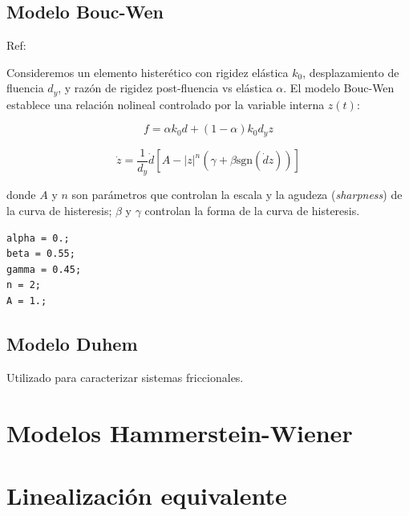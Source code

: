 \subsection{Modelo Bouc-Wen}

Ref: \textcite{song2006generalizedbouc}

Consideremos un elemento histerético con rigidez elástica $k_0$, desplazamiento de fluencia $d_y$, y razón de rigidez post-fluencia vs elástica $\alpha$. El modelo Bouc-Wen establece una relación nolineal controlado por la variable interna $z(t)$:

\begin{equation}
    f = \alpha k_0 d + (1-\alpha) k_0 d_y z
\end{equation}


\begin{equation}
    \dot{z} = \frac{1}{d_y} \dot{d} \left[ A  - \left|z\right|^{n} \left( \gamma + \beta \text{sgn}(\dot{d} z) \right)\right]
\end{equation}

\noindent donde $A$ y $n$ son parámetros que controlan la escala y la agudeza (\emph{sharpness}) de la curva de histeresis; $\beta$ y $\gamma$ controlan la forma de la curva de histeresis.


\begin{lstlisting}[style=matlab-editor]
alpha = 0.;
beta = 0.55;
gamma = 0.45;
n = 2;
A = 1.;
\end{lstlisting}

\subsection{Modelo Duhem}

Utilizado para caracterizar sistemas friccionales.

\section{Modelos Hammerstein-Wiener}




\section{Linealización equivalente}

\textcite{roberts2003randomvibration}